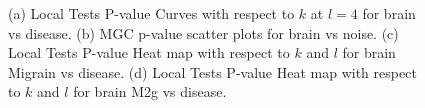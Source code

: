 \documentclass[11pt]{article}
\begin{document}
\begin{figure}[htbp]
\centering
{}
\hfil
\centering
{}
\hfil
\centering
{}
\hfil
\centering
{}
\caption{
(a) Local Tests P-value Curves with respect to $k$ at $l=4$ for brain vs disease. 
(b) MGC p-value scatter plots for brain vs noise.
(c) Local Tests P-value Heat map with respect to $k$ and $l$ for brain Migrain vs disease. 
(d) Local Tests P-value Heat map with respect to $k$ and $l$ for brain M2g vs disease. }
\label{figReal}
\end{figure}
\end{document}
